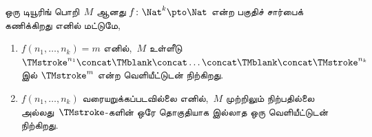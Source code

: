 \documentclass[../../../include/open-logic-section]{subfiles}
\begin{document}
\begin{defn}
  ஒரு டியூரிங் பொறி~$M$ ஆனது $f\colon \Nat^k
  \pto \Nat$ என்ற பகுதிச் சார்பைக் கணிக்கிறது எனில் மட்டுமே,
  \begin{enumerate}
    \item $f(n_1, \dots, n_k) = m$ எனில்,~$M$ உள்ளீடு
    $\TMstroke^{n_1}\concat\TMblank\concat
    \dots \concat\TMblank\concat\TMstroke^{n_k}$ இல்
    $\TMstroke^{m}$ என்ற வெளியீட்டுடன் நிற்கிறது.
    \item $f(n_1, \dots, n_k)$ வரையறுக்கப்படவில்லை எனில்,~$M$
    முற்றிலும் நிற்பதில்லை அல்லது~$\TMstroke$-களின் ஒரே தொகுதியாக
    இல்லாத ஒரு வெளியீட்டுடன் நிற்கிறது.
  \end{enumerate}
\end{defn}
\end{document}
